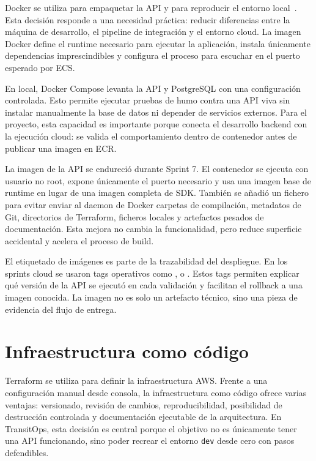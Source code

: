 Docker se utiliza para empaquetar la API y para reproducir el entorno local~\cite{DockerDocs}. Esta decisión responde a una necesidad práctica: reducir diferencias entre la máquina de desarrollo, el pipeline de integración y el entorno cloud. La imagen Docker define el runtime necesario para ejecutar la aplicación, instala únicamente dependencias imprescindibles y configura el proceso para escuchar en el puerto esperado por ECS.

En local, Docker Compose levanta la API y PostgreSQL con una configuración controlada. Esto permite ejecutar pruebas de humo contra una API viva sin instalar manualmente la base de datos ni depender de servicios externos. Para el proyecto, esta capacidad es importante porque conecta el desarrollo backend con la ejecución cloud: se valida el comportamiento dentro de contenedor antes de publicar una imagen en ECR.

La imagen de la API se endureció durante Sprint 7. El contenedor se ejecuta con usuario no root, expone únicamente el puerto necesario y usa una imagen base de runtime en lugar de una imagen completa de SDK. También se añadió un fichero  para evitar enviar al daemon de Docker carpetas de compilación, metadatos de Git, directorios de Terraform, ficheros locales y artefactos pesados de documentación. Esta mejora no cambia la funcionalidad, pero reduce superficie accidental y acelera el proceso de build.

El etiquetado de imágenes es parte de la trazabilidad del despliegue. En los sprints cloud se usaron tags operativos como ,  o . Estos tags permiten explicar qué versión de la API se ejecutó en cada validación y facilitan el rollback a una imagen conocida. La imagen no es solo un artefacto técnico, sino una pieza de evidencia del flujo de entrega.

\section{Infraestructura como código}
\label{sec:marco-iac}

Terraform se utiliza para definir la infraestructura AWS. Frente a una configuración manual desde consola, la infraestructura como código ofrece varias ventajas: versionado, revisión de cambios, reproducibilidad, posibilidad de destrucción controlada y documentación ejecutable de la arquitectura. En TransitOps, esta decisión es central porque el objetivo no es únicamente tener una API funcionando, sino poder recrear el entorno \texttt{dev} desde cero con pasos defendibles.

